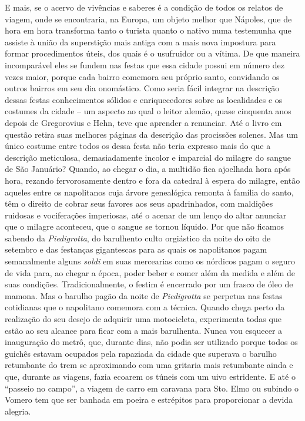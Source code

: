E mais, se o acervo de vivências e saberes é a condição de todos os
relatos de viagem, onde se encontraria, na Europa, um objeto melhor que
Nápoles, que de hora em hora transforma tanto o turista quanto o nativo
numa testemunha que assiste à união da superstição mais antiga com a
mais nova impostura para formar procedimentos úteis, dos quais é o
usufruidor ou a vítima. De que maneira incomparável eles se fundem nas
festas que essa cidade possui em número dez vezes maior, porque cada
bairro comemora seu próprio santo, convidando os outros bairros em seu
dia onomástico. Como seria fácil integrar na descrição dessas festas
conhecimentos sólidos e enriquecedores sobre as localidades e os
costumes da cidade -- um aspecto ao qual o leitor alemão, quase
cinquenta anos depois de Gregorovius e Hehn, teve que aprender a
renunciar. Até o livro em questão retira suas melhores páginas da
descrição das procissões solenes. Mas um único costume entre todos os
dessa festa não teria expresso mais do que a descrição meticulosa,
demasiadamente incolor e imparcial do milagre do sangue de São Januário?
Quando, ao chegar o dia, a multidão fica ajoelhada hora após hora,
rezando fervorosamente dentro e fora da catedral à espera do milagre,
então aqueles entre os napolitanos cuja árvore genealógica remonta à
família do santo, têm o direito de cobrar seus favores aos seus
apadrinhados, com maldições ruidosas e vociferações imperiosas, até o
acenar de um lenço do altar anunciar que o milagre aconteceu, que o
sangue se tornou líquido. Por que não ficamos sabendo da
\emph{Piedigrotta}, do barulhento culto orgiástico da noite do oito de
setembro e das festanças gigantescas para as quais os napolitanos pagam
semanalmente alguns \emph{soldi} em suas mercearias como os nórdicos
pagam o seguro de vida para, ao chegar a época, poder beber e comer além
da medida e além de suas condições. Tradicionalmente, o festim é
encerrado por um frasco de óleo de mamona. Mas o barulho pagão da noite
de \emph{Piedigrotta} se perpetua nas festas cotidianas que o napolitano
comemora com a técnica. Quando chega perto da realização do seu desejo
de adquirir uma motocicleta, experimenta todas que estão ao seu alcance
para ficar com a mais barulhenta. Nunca vou esquecer a inauguração do
metrô, que, durante dias, não podia ser utilizado porque todos os
guichês estavam ocupados pela rapaziada da cidade que superava o barulho
retumbante do trem se aproximando com uma gritaria mais retumbante ainda
e que, durante as viagens, fazia ecoarem os túneis com um uivo
estridente. E até o ``passeio no campo'', a viagem de carro em caravana
para Sto. Elmo ou subindo o Vomero tem que ser banhada em poeira e
estrépitos para proporcionar a devida alegria.

